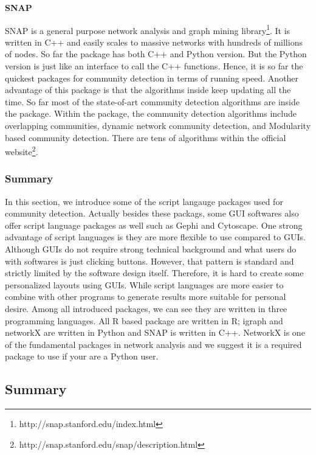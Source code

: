 \textbf{SNAP} 

SNAP \cite{sosic2015large} is a general purpose network analysis and graph mining library\footnote{http://snap.stanford.edu/index.html}. It is written in C++ and easily scales to massive networks with hundreds of millions of nodes. So far the package has both C++ and Python version. But the Python version is just like an interface to call the C++ functions. Hence, it is so far the quickest packages for community detection in terms of running speed. Another advantage of this package is that the algorithms inside keep updating all the time. So far most of the state-of-art community detection algorithms are inside the package. Within the package, the community detection algorithms include overlapping communities, dynamic network community detection, and Modularity based community detection. There are tens of algorithms within the official website\footnote{http://snap.stanford.edu/snap/description.html}. 

\subsubsection{Summary}
In this section, we introduce some of the script langauge packages used for community detection. Actually besides these packags, some GUI softwares also offer script language packages as well such  as Gephi and Cytoscape. One strong advantage of script languages is they are more flexible to use compared to GUIs. Although GUIs do not require strong technical background and what users do with softwares is just clicking buttons. However, that pattern is standard and strictly limited by the software design itself. Therefore, it is hard to create some personalized layouts using GUIs. While script languages are more easier to combine with other programs to generate results more suitable for personal desire. Among all introduced packages, we can see they are written in three programming languages. All R based package are written in R; igraph and networkX are written in Python and SNAP is written in C++.  NetworkX is one of the fundamental packages in network analysis and we suggest it is a required package to use if your are a Python user.
\subsection{Summary}
